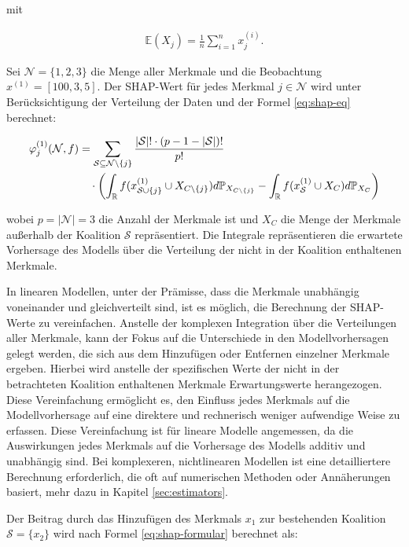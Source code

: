 mit 

\begin{align}
    \label{eq:e}
    \mathbb{E}(X_j) = \frac{1}{n} \sum_{i=1}^{n} x_j^{(i)}.
\end{align}     

Sei $\mathcal{N} = \{1, 2, 3\}$ die Menge aller Merkmale und die Beobachtung $x^{(1)} = [100, 3, 5]$. 
Der SHAP-Wert für jedes Merkmal $j \in \mathcal{N}$ wird unter Berücksichtigung der Verteilung der 
Daten und der Formel \ref{eq:shap-eq} berechnet:

\begin{align}
    \label{eq:shap-formular}
    \varphi^{(1)}_{j} (\mathcal{N}, f) &= \sum_{\mathcal{S} \subseteq \mathcal{N} \setminus \{j\}} \frac{|\mathcal{S}|! \cdot (p - 1 - |\mathcal{S}|)!}{p!} \\ \notag
    &\quad \cdot \left( \int_{\mathbb{R}} f(x^{(1)}_{\mathcal{S} \cup \{j\}} \cup X_{C \setminus \{j\}}) d\mathbb{P}_{X_{C \setminus \{j\}}} -
    \int_{\mathbb{R}} f(x^{(1)}_{\mathcal{S}} \cup X_{C}) d\mathbb{P}_{X_{C}} \right) 
\end{align}

wobei $p = |\mathcal{N}| = 3$ die Anzahl der Merkmale ist und $X_C$ die Menge der Merkmale 
außerhalb der Koalition $\mathcal{S}$ repräsentiert. Die Integrale repräsentieren die erwartete 
Vorhersage des Modells über die Verteilung der nicht in der Koalition enthaltenen Merkmale.

In linearen Modellen, unter der Prämisse, dass die Merkmale unabhängig voneinander und gleichverteilt sind, 
ist es möglich, die Berechnung der SHAP-Werte zu vereinfachen. Anstelle der komplexen Integration 
über die Verteilungen aller Merkmale, kann der Fokus auf die Unterschiede in den Modellvorhersagen gelegt werden, 
die sich aus dem Hinzufügen oder Entfernen einzelner Merkmale ergeben. 
Hierbei wird anstelle der spezifischen Werte der nicht in der betrachteten Koalition enthaltenen Merkmale 
Erwartungswerte herangezogen. Diese Vereinfachung ermöglicht es, den Einfluss jedes Merkmals auf 
die Modellvorhersage auf eine direktere und rechnerisch weniger aufwendige Weise zu erfassen.
Diese Vereinfachung ist für lineare Modelle angemessen, da die Auswirkungen jedes Merkmals 
auf die Vorhersage des Modells additiv und unabhängig sind. Bei komplexeren, 
nichtlinearen Modellen ist eine detailliertere Berechnung erforderlich, 
die oft auf numerischen Methoden oder Annäherungen basiert, mehr dazu in Kapitel \ref{sec:estimators}.

Der Beitrag durch das Hinzufügen des Merkmals $x_1$ zur bestehenden Koalition $\mathcal{S} = \{x_2\}$ wird
nach Formel \ref{eq:shap-formular} berechnet als:

